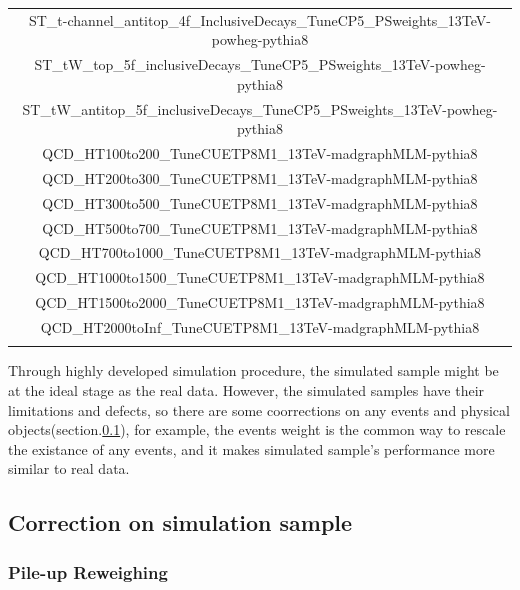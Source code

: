 \begin{center}
\begin{longtable}{ | c | }
		ST\_t-channel\_antitop\_4f\_InclusiveDecays\_TuneCP5\_PSweights\_13TeV-powheg-pythia8 \\
		ST\_tW\_top\_5f\_inclusiveDecays\_TuneCP5\_PSweights\_13TeV-powheg-pythia8 \\
		ST\_tW\_antitop\_5f\_inclusiveDecays\_TuneCP5\_PSweights\_13TeV-powheg-pythia8 \\
		\hline
		QCD\_HT100to200\_TuneCUETP8M1\_13TeV-madgraphMLM-pythia8 \\
		QCD\_HT200to300\_TuneCUETP8M1\_13TeV-madgraphMLM-pythia8 \\
		QCD\_HT300to500\_TuneCUETP8M1\_13TeV-madgraphMLM-pythia8 \\
		QCD\_HT500to700\_TuneCUETP8M1\_13TeV-madgraphMLM-pythia8 \\
		QCD\_HT700to1000\_TuneCUETP8M1\_13TeV-madgraphMLM-pythia8 \\
		QCD\_HT1000to1500\_TuneCUETP8M1\_13TeV-madgraphMLM-pythia8 \\
		QCD\_HT1500to2000\_TuneCUETP8M1\_13TeV-madgraphMLM-pythia8 \\
		QCD\_HT2000toInf\_TuneCUETP8M1\_13TeV-madgraphMLM-pythia8 \\
		\hline
		\label{DataMC:tb:filename}
		\end{longtable}
		\end{center}



		Through highly developed simulation procedure, the simulated sample might be at the ideal stage as the real data. However, the simulated samples have their limitations and defects, so there are some coorrections on any events and physical objects(section.\ref{ssec:DataAndMC_corMC}), for example, the events weight is the common way to rescale the existance of any events, and it makes simulated sample's performance more similar to real data.

	\subsection{Correction on simulation sample}
	\label{ssec:DataAndMC_corMC}

		\subsubsection{Pile-up Reweighing}
		\label{sssec:DataAndMC_PU}


